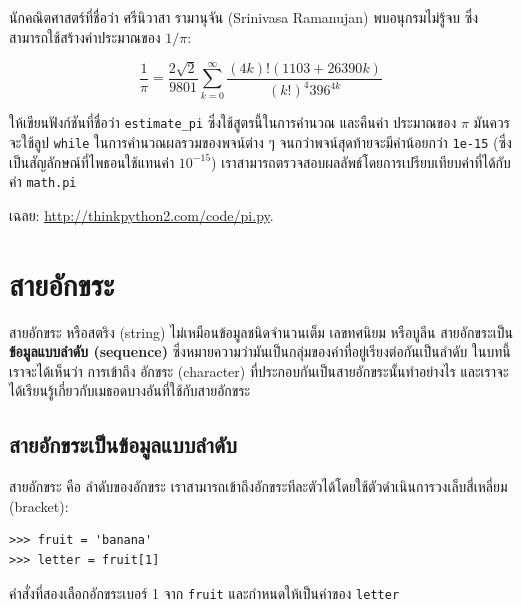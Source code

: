 \begin{exercise}

นักคณิตศาสตร์ที่ชื่อว่า ศรีนิวาสา รามานุจัน (Srinivasa Ramanujan) 
พบอนุกรมไม่รู้จบ ซึ่งสามารถใช้สร้างค่าประมาณของ {\scriptsize$1 / \pi$}:

\[ \frac{1}{\pi} = \frac{2\sqrt{2}}{9801} 
\sum^\infty_{k=0} \frac{(4k)!(1103+26390k)}{(k!)^4 396^{4k}} \]

ให้เขียนฟังก์ชันที่ชื่อว่า \verb"estimate_pi" ซึ่งใช้สูตรนี้ในการคำนวณ และคืนค่า
ประมาณของ {\scriptsize$\pi$} มันควรจะใช้ลูป {\tt while} ในการคำนวณผลรวมของพจน์ต่าง ๆ 
จนกว่าพจน์สุดท้ายจะมีค่าน้อยกว่า {\tt 1e-15} (ซึ่งเป็นสัญลักษณ์ที่ไพธอนใช้แทนค่า {\scriptsize$10^{-15}$})
เราสามารถตรวจสอบผลลัพธ์โดยการเปรียบเทียบค่าที่ได้กับค่า {\tt math.pi}

เฉลย: \url{http://thinkpython2.com/code/pi.py}.

\end{exercise}



\chapter{สายอักขระ} %
\label{strings}

สายอักขระ หรือสตริง (string) ไม่เหมือนข้อมูลชนิดจำนวนเต็ม เลขทศนิยม หรือบูลีน  สายอักขระเป็น {\bf ข้อมูลแบบลำดับ (sequence)}
ซึ่งหมายความว่ามันเป็นกลุ่มของค่าที่อยู่เรียงต่อกันเป็นลำดับ  ในบทนี้ เราจะได้เห็นว่า 
การเข้าถึง อักขระ (character) ที่ประกอบกันเป็นสายอักขระนั้นทำอย่างไร 
และเราจะได้เรียนรู้เกี่ยวกับเมธอดบางอันที่ใช้กับสายอักขระ 

\section{สายอักขระเป็นข้อมูลแบบลำดับ}%


สายอักขระ คือ ลำดับของอักขระ 
เราสามารถเข้าถึงอักขระทีละตัวได้โดยใช้ตัวดำเนินการวงเล็บสี่เหลี่ยม (bracket):


\begin{verbatim}
>>> fruit = 'banana'
>>> letter = fruit[1]
\end{verbatim}
%
คำสั่งที่สองเลือกอักขระเบอร์ 1 จาก {\tt fruit} และกำหนดให้เป็นค่าของ {\tt letter}

